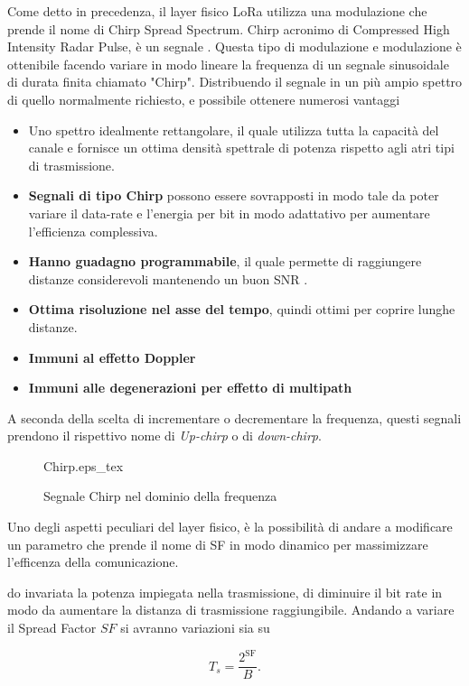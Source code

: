 Come detto in precedenza, il layer fisico LoRa utilizza una modulazione che
prende il nome di Chirp Spread Spectrum. Chirp acronimo di Compressed High
Intensity Radar Pulse, è un segnale  . Questa tipo di modulazione e modulazione è ottenibile facendo
variare in modo lineare la frequenza di un segnale sinusoidale di durata finita
chiamato "Chirp". 
Distribuendo il segnale in un più ampio spettro di quello normalmente richiesto,
e possibile ottenere numerosi vantaggi 
\begin{itemize}
\item Uno spettro idealmente rettangolare, il quale utilizza tutta la capacità
del canale e fornisce un ottima densità spettrale di potenza rispetto agli atri
tipi di trasmissione.
\item \textbf{Segnali di tipo Chirp} possono essere sovrapposti in modo tale da
poter variare il data-rate e l'energia per bit in modo adattativo per aumentare
l'efficienza complessiva.
\item \textbf{Hanno guadagno programmabile}, il quale permette di raggiungere
distanze considerevoli mantenendo un buon SNR .
\item  \textbf{Ottima risoluzione nel asse del tempo}, quindi ottimi per coprire
lunghe distanze.
\item \textbf{Immuni al effetto Doppler} 
\item \textbf{Immuni alle degenerazioni per effetto di multipath} 
\end{itemize}
A seconda della scelta di incrementare o decrementare la frequenza, questi
segnali prendono il rispettivo nome di \emph{Up-chirp} o di \emph{down-chirp}.

\begin{figure}[h]
        \centering
                {Chirp.eps_tex}
        \caption{Segnale Chirp nel dominio della frequenza}
\end{figure}

Uno degli aspetti peculiari del layer fisico, è la possibilità di andare a
modificare un parametro che prende il nome di SF in modo dinamico per
massimizzare l'efficenza della comunicazione.

do
invariata la potenza impiegata nella trasmissione, di diminuire il bit rate in
modo da aumentare la distanza di trasmissione raggiungibile.
Andando a variare il Spread Factor $SF$ si avranno variazioni sia su

\begin{equation}
        T_s=\frac{2^{\text{SF}}}{B}.
\end{equation}

